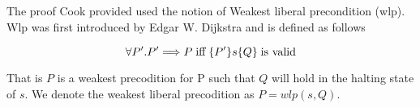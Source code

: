 The proof Cook provided used the notion of Weakest liberal precondition (wlp). Wlp was first introduced by Edgar W. Dijkstra and is defined as follows

$$
\forall P'. P' \Longrightarrow P \; \text{iff} \; \{P'\}s\{Q\} \; \text{is valid}
$$

That is $P$ is a weakest precodition for P such that $Q$ will hold in the halting state of $s$. We denote
the weakest liberal precodition as $P = wlp(s,Q)$.